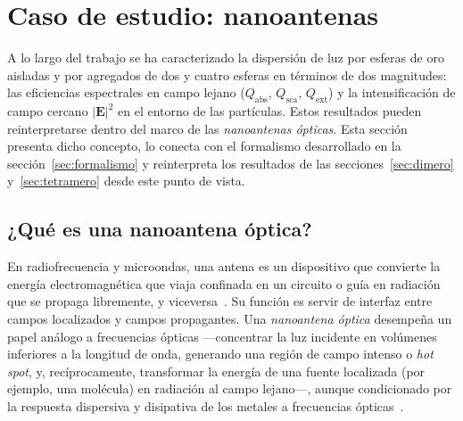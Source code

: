 \section{Caso de estudio: nanoantenas}
\label{sec:nanoantenas}

A lo largo del trabajo se ha caracterizado la dispersión de luz por esferas
de oro aisladas y por agregados de dos y cuatro esferas en términos de dos
magnitudes: las eficiencias espectrales en campo lejano
($Q_\text{abs}$, $Q_\text{sca}$, $Q_\text{ext}$) y la intensificación de
campo cercano $|\mathbf{E}|^2$ en el entorno de las partículas. Estos
resultados pueden reinterpretarse dentro del marco de las
\emph{nanoantenas ópticas}. Esta sección presenta dicho concepto, lo
conecta con el formalismo desarrollado en la sección~\ref{sec:formalismo} y
reinterpreta los resultados de las secciones~\ref{sec:dimero}
y~\ref{sec:tetramero} desde este punto de vista.

\subsection{¿Qué es una nanoantena óptica?}
\label{subsec:que_es_nanoantena}

En radiofrecuencia y microondas, una antena es un dispositivo que convierte
la energía electromagnética que viaja confinada en un circuito o guía en
radiación que se propaga libremente, y viceversa~\cite{Novotny2011}. Su
función es servir de interfaz entre campos localizados y campos propagantes.
Una \emph{nanoantena óptica} desempeña un papel análogo a frecuencias
ópticas —concentrar la luz incidente en volúmenes inferiores a la
longitud de onda, generando una región de campo intenso o \emph{hot spot},
y, recíprocamente, transformar la energía de una fuente localizada (por
ejemplo, una molécula) en radiación al campo lejano—, aunque condicionado
por la respuesta dispersiva y disipativa de los metales a frecuencias
ópticas~\cite{Bharadwaj2009,Novotny2011}.


